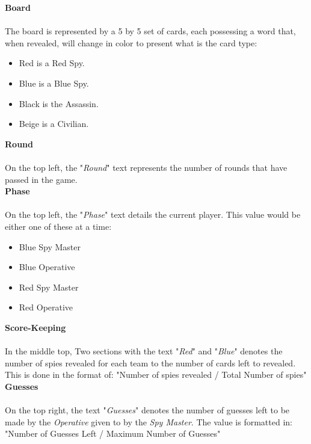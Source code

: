 \documentclass[10pt, a4paper]{article}
\begin{document}
		\textbf{Board}\\
		\\
		The board is represented by a 5 by 5 set of cards, each possessing a word that, when revealed, will change in color to present what is the card type:  
		    \begin{itemize}
		        \item Red is a Red Spy.
		        \item Blue is a Blue Spy.
		        \item Black is the Assassin.
		        \item Beige is a Civilian.
		    \end{itemize}
		    
	    \textbf{Round}\\
	    \\
	    On the top left, the "\textit{Round}" text represents the number of rounds that have passed in the game.\\
	    
	    \textbf{Phase}\\
	    \\
	    On the top left, the "\textit{Phase}" text details the current player. This value would be either one of these at a time:
	        \begin{itemize}
	            \item Blue Spy Master
	            \item Blue Operative
	            \item Red Spy Master
	            \item Red Operative
	        \end{itemize}
	   
	   \textbf{Score-Keeping}\\
	   \\
	   In the middle top, Two sections with the text "\textit{Red}" and "\textit{Blue}" denotes the number of spies revealed for each team to the number of cards left to revealed. This is done in the format of: "Number of spies revealed / Total Number of spies"\\
	   
	   \textbf{Guesses}\\
	   \\
	    On the top right, the text "\textit{Guesses}" denotes the number of guesses left to be made by the \textit{Operative} given to by the \textit{Spy Master}. The value is formatted in: "Number of Guesses Left / Maximum Number of Guesses"\\
	   
\end{document}
